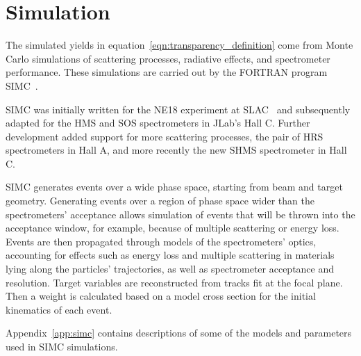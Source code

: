 \section{Simulation} \label{sec:simulation_intro}
The simulated yields in equation~\ref{eqn:transparency_definition} come from
Monte Carlo simulations of scattering processes, radiative effects,
and spectrometer performance.
These simulations are carried out by the FORTRAN program
SIMC~\cite{simc_github, simc_wiki}.


SIMC was initially written for the NE18 experiment at
SLAC~\cite{Makins_1994} and subsequently adapted for the HMS and SOS
spectrometers in JLab's Hall C.
Further development added support for more scattering processes, the pair of
HRS spectrometers in Hall A, and more recently the new SHMS spectrometer in
Hall C.


SIMC generates events over a wide phase space, starting from beam and
target geometry.
Generating events over a region of phase space wider than the spectrometers'
acceptance allows simulation of events that will be thrown into the acceptance
window, for example, because of multiple scattering or energy loss.
Events are then propagated through models of the spectrometers' optics,
accounting for effects such as energy loss and multiple scattering in materials
lying along the particles' trajectories, as well as spectrometer acceptance and
resolution.
Target variables are reconstructed from tracks fit at the focal plane.
Then a weight is calculated based on a model cross section for the initial
kinematics of each event.


Appendix~\ref{app:simc} contains descriptions of some of the models and
parameters used in SIMC simulations.
